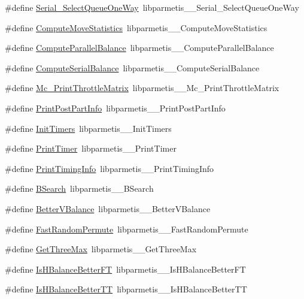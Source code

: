 \begin{DoxyCompactItemize}
\item 
\#define \hyperlink{a00960_a193ed0f8cc06add0c3edd1107a5320f3}{Serial\+\_\+\+Select\+Queue\+One\+Way}~libparmetis\+\_\+\+\_\+\+Serial\+\_\+\+Select\+Queue\+One\+Way
\item 
\#define \hyperlink{a00960_ab2230f1e74930d045b13f3a7b094da9b}{Compute\+Move\+Statistics}~libparmetis\+\_\+\+\_\+\+Compute\+Move\+Statistics
\item 
\#define \hyperlink{a00960_ad817fce9087789e8a431e241a134b3f0}{Compute\+Parallel\+Balance}~libparmetis\+\_\+\+\_\+\+Compute\+Parallel\+Balance
\item 
\#define \hyperlink{a00960_a3558ffde96b575fb5c1d7a61c6276ba5}{Compute\+Serial\+Balance}~libparmetis\+\_\+\+\_\+\+Compute\+Serial\+Balance
\item 
\#define \hyperlink{a00960_ae9d9ba398fc1bf487301510faef14440}{Mc\+\_\+\+Print\+Throttle\+Matrix}~libparmetis\+\_\+\+\_\+\+Mc\+\_\+\+Print\+Throttle\+Matrix
\item 
\#define \hyperlink{a00960_a3ff9a6e82a9a5088f3ef0de7af408b89}{Print\+Post\+Part\+Info}~libparmetis\+\_\+\+\_\+\+Print\+Post\+Part\+Info
\item 
\#define \hyperlink{a00960_a4a790a1f9ba8aca5c47e8f45be1c950e}{Init\+Timers}~libparmetis\+\_\+\+\_\+\+Init\+Timers
\item 
\#define \hyperlink{a00960_a1a7865c19742a7f3a9aebe055157d26f}{Print\+Timer}~libparmetis\+\_\+\+\_\+\+Print\+Timer
\item 
\#define \hyperlink{a00960_acfc081aca2006591c5caecf83a82044f}{Print\+Timing\+Info}~libparmetis\+\_\+\+\_\+\+Print\+Timing\+Info
\item 
\#define \hyperlink{a00960_ad8424748f563cff2b044fcd6d5a8c112}{B\+Search}~libparmetis\+\_\+\+\_\+\+B\+Search
\item 
\#define \hyperlink{a00960_a192db025e9c93809b1de0beb80aadbbd}{Better\+V\+Balance}~libparmetis\+\_\+\+\_\+\+Better\+V\+Balance
\item 
\#define \hyperlink{a00960_a53319a91030a711d576dc7cdd33b36a0}{Fast\+Random\+Permute}~libparmetis\+\_\+\+\_\+\+Fast\+Random\+Permute
\item 
\#define \hyperlink{a00960_aa1abbc19b41047b14c9fdb835c45dbc2}{Get\+Three\+Max}~libparmetis\+\_\+\+\_\+\+Get\+Three\+Max
\item 
\#define \hyperlink{a00960_ac6f20e924d439a6302d566e906338678}{Is\+H\+Balance\+Better\+FT}~libparmetis\+\_\+\+\_\+\+Is\+H\+Balance\+Better\+FT
\item 
\#define \hyperlink{a00960_a315690cfeb028f1c0b6773f1ea3290a4}{Is\+H\+Balance\+Better\+TT}~libparmetis\+\_\+\+\_\+\+Is\+H\+Balance\+Better\+TT

\end{DoxyCompactItemize}
